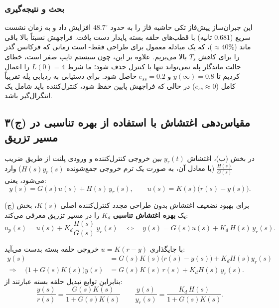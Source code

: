 \documentclass[a4paper]{article}
\begin{document}
\subsubsection{بحث و نتیجه‌گیری}
این جبران‌ساز پیش‌فاز تکی حاشیه فاز را به حدود $48.7^\circ$ افزایش داد و به زمان نشست سریع ($0.681$ ثانیه) با قطب‌های حلقه بسته پایدار دست یافت. فراجهش نسبتاً بالا باقی ماند ($\approx 40\%$)، که یک مبادله  معمول برای طراحی فقط- است زمانی که فرکانس گذر را برای کاهش $T_s$ بالا می‌بریم. علاوه بر این، چون سیستم تایپ صفر است، خطای حالت ماندگار پله نمی‌تواند تنها با کنترل  حذف شود؛ ما شرط $L(0)=4$ را اعمال کردیم تا $y(\infty)=0.8$ و $e_{ss}=0.2$ حاصل شود. برای دستیابی به ردیابی پله تقریباً کامل ($e_{ss}\approx 0$) در حالی که فراجهش پایین حفظ شود، کنترل‌کننده باید شامل یک انتگرال‌گیر  باشد.

\newpage
\subsection{۳(ج) مقیاس‌دهی اغتشاش با استفاده از بهره تناسبی  در مسیر تزریق }

در بخش (ب)، اغتشاش $y_r(t)$ \emph{بین} خروجی کنترل‌کننده و ورودی پلنت از طریق ضریب $\frac{H(s)}{G(s)}$ (یا معادل آن، به صورت یک ترم خروجی جمع‌شونده $H(s)y_r(s)$) وارد می‌شود، یعنی:
\begin{equation}
	y(s)=G(s)u(s)+H(s)\,y_r(s),\qquad u(s)=K(s)\big(r(s)-y(s)\big).
\end{equation}

برای بهبود تضعیف اغتشاش بدون طراحی مجدد کنترل‌کننده اصلی $K(s)$، بخش (ج) یک \textbf{بهره اغتشاش تناسبی} $K_d$ را در مسیر تزریق معرفی می‌کند:
\begin{equation}
	u_p(s)=u(s)+K_d\frac{H(s)}{G(s)}\,y_r(s)
	\quad\Longleftrightarrow\quad
	y(s)=G(s)u(s)+K_d\,H(s)\,y_r(s).
\end{equation}

با جایگذاری $u=K(r-y)$ خروجی حلقه بسته بدست می‌آید:
\begin{align}
	y(s)
	&=G(s)K(s)\big(r(s)-y(s)\big)+K_dH(s)y_r(s) \\
	\Rightarrow\quad
	\big(1+G(s)K(s)\big)y(s)
	&=G(s)K(s)\,r(s)+K_dH(s)\,y_r(s).
\end{align}
بنابراین توابع تبدیل حلقه بسته عبارتند از:
\begin{equation}
	\boxed{
		\frac{y(s)}{r(s)}=\frac{G(s)K(s)}{1+G(s)K(s)}
	}
	\qquad
	\boxed{
		\frac{y(s)}{y_r(s)}=\frac{K_d\,H(s)}{1+G(s)K(s)}.
	}
\end{equation}
\end{document}
